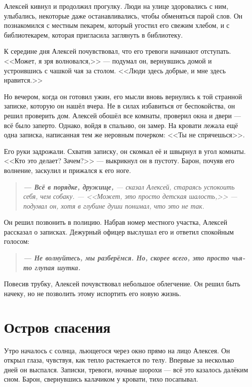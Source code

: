 \documentclass[12pt,a4paper]{book}
\newenvironment{dialogue}{\begin{quote}\itshape}{\end{quote}} %
\begin{document}
Алексей кивнул и продолжил прогулку. Люди на улице здоровались с ним, улыбались, некоторые даже останавливались, чтобы обменяться парой слов. Он познакомился с местным пекарем, который угостил его свежим хлебом, и с библиотекарем, которая пригласила заглянуть в библиотеку.

К середине дня Алексей почувствовал, что его тревоги начинают отступать. <<Может, я зря волновался,>> --- подумал он, вернувшись домой и устроившись с чашкой чая за столом. <<Люди здесь добрые, и мне здесь нравится.>>

Но вечером, когда он готовил ужин, его мысли вновь вернулись к той странной записке, которую он нашёл вчера. Не в силах избавиться от беспокойства, он решил проверить дом. Алексей обошёл все комнаты, проверил окна и двери --- всё было заперто. Однако, войдя в спальню, он замер. На кровати лежала ещё одна записка, написанная тем же неровным почерком: <<Ты не спрячешься>>.

Его руки задрожали. Схватив записку, он скомкал её и швырнул в угол комнаты. <<Кто это делает? Зачем?>> --- выкрикнул он в пустоту. Барон, почуяв его волнение, заскулил и прижался к его ноге.

\begin{dialogue}
\textbf{--- Всё в порядке, дружище,} --- сказал Алексей, стараясь успокоить себя, чем собаку. --- <<Может, это просто детская шалость,>> --- подумал он, хотя в глубине души понимал, что это не так.
\end{dialogue}

Он решил позвонить в полицию. Набрав номер местного участка, Алексей рассказал о записках. Дежурный офицер выслушал его и ответил спокойным голосом:

\begin{dialogue}
\textbf{--- Не волнуйтесь, мы разберёмся. Но, скорее всего, это просто чья-то глупая шутка.}
\end{dialogue}

Повесив трубку, Алексей почувствовал небольшое облегчение. Он решил быть начеку, но не позволить этому испортить его новую жизнь.

\chapter{Остров спасения}

Утро началось с солнца, льющегося через окно прямо на лицо Алексея. Он открыл глаза, чувствуя, как тепло растекается по телу. Впервые за несколько дней он выспался. Записки, тревоги, ночные шорохи --- всё это казалось далёким сном. Барон, свернувшись калачиком у кровати, тихо посапывал.
\end{document}

